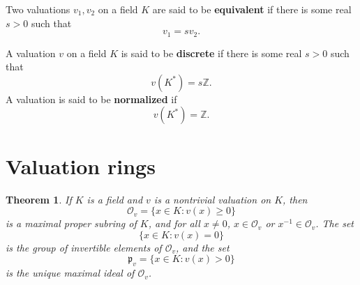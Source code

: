 \documentclass{article}
\theoremstyle{plain}
\newtheorem{theorem}{Theorem}
\theoremstyle{definition}
\begin{document}
Two valuations $v_1,v_2$ on a field $K$ are said to be \textbf{equivalent} if there is some
real $s>0$ such that
\[
v_1=sv_2.
\]

A valuation $v$ on a field $K$ is said to be \textbf{discrete} if there is some real $s>0$ such that
\[
v(K^*) = s\mathbb{Z}.
\]
A valuation is said to be \textbf{normalized} if
\[
v(K^*)=\mathbb{Z}.
\]


\section{Valuation rings}
\begin{theorem}
If $K$ is a field and $v$ is a nontrivial valuation on $K$, then 
\[
\mathcal{O}_v = \{x \in K: v(x) \geq 0\}
\]
is a maximal proper subring of $K$, and for all $x \neq 0$, $x \in \mathcal{O}_v$ or $x^{-1} \in
\mathcal{O}_v$. The set
\[
\{x \in K: v(x)=0\}
\]
is the group of invertible elements of $\mathcal{O}_v$, and the set 
\[
\mathfrak{p}_v=\{x \in K: v(x)>0\}
\]
is the unique maximal ideal  of $\mathcal{O}_v$.
\label{valring}
\end{theorem}
\end{document}
